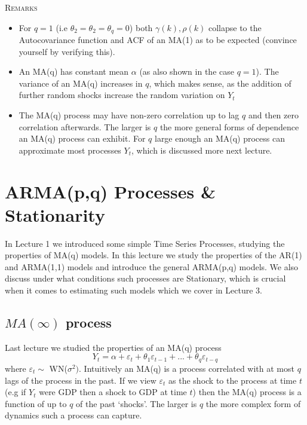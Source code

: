 \documentclass[openany]{tufte-book} %
\begin{document}
\textsc{Remarks}
\begin{itemize}
\item For $q=1$ (i.e $\theta_2=\theta_2=\theta_q=0$) both $\gamma(k),\rho(k)$ collapse to the Autocovariance function  and ACF of an MA(1) as to be expected (convince yourself by verifying this).
\item An MA(q) has constant mean $\alpha$ (as also shown in the case $q=1$). The variance of an MA(q) increases in $q$, which makes sense, as the addition of further random shocks increase the random variation on $Y_t$

    \item The MA(q) process may have non-zero correlation up to lag $q$ and then zero correlation afterwards. The larger is $q$ the more general forms of dependence an MA(q) process can exhibit. For $q$ large enough an MA(q) process can approximate  most processes $Y_t$, which is discussed more next lecture.
        \end{itemize}







\chapter[ARMA(p,q) Processes \& Stationarity ]{ARMA(p,q) Processes \& Stationarity }
\label{ch:-ARMA}

In Lecture 1 we introduced some simple Time Series Processes, studying the properties of MA(q) models. In this lecture we study the properties of the AR(1) and ARMA(1,1) models and introduce the general ARMA(p,q) models. We also discuss under what conditions such processes are Stationary, which is crucial when it comes to estimating such models which we cover in Lecture 3.

\section{$MA\left( \infty \right) $ process}
Last lecture we studied the properties of an MA(q) process
\begin{equation*}
Y_{t}=\alpha +\varepsilon_{t}+\theta_{1}\varepsilon_{t-1}+...+\theta_{q}\varepsilon_{t-q} \label{MAq}
\end{equation*}
 where $\varepsilon_t\sim$ WN($\sigma^2)$. Intuitively an MA(q) is a process correlated with at most $q$ lags of the process in the past. If we view $\varepsilon_t$ as the shock to the process at time $t$ (e.g if $Y_t$ were GDP then a shock to GDP at time $t$) then the MA(q) process is a function of up to  $q$  of the past `shocks'. The larger is $q$ the more complex form of dynamics such a process can capture.
\end{document}
